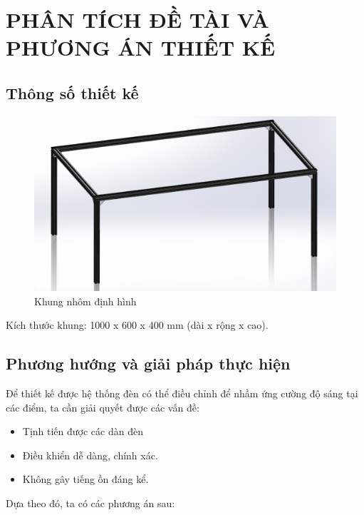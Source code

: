 \chapter{PHÂN TÍCH ĐỀ TÀI VÀ PHƯƠNG ÁN THIẾT KẾ}
\section{Thông số thiết kế}

\begin{center}
    \begin{figure}[ht]
    \begin{center}
     \includegraphics[scale=1]{Chapters/Chapter3/Images/Khungnhomdinhhinh}
    \end{center}
    \caption{Khung nhôm định hình}
    \label{fig:khungnhom}
    \end{figure}
\end{center}

Kích thước khung: 1000 x 600 x 400 mm (dài x rộng x cao).

\section{Phương hướng và giải pháp thực hiện}
Để thiết kế được hệ thống đèn có thể điều chỉnh để nhầm ứng cường độ sáng tại các điểm, ta cần giải quyết được các vấn đề:
\begin{itemize}
\item Tịnh tiến được các dàn đèn
\item Điều khiển dễ dàng, chính xác.
\item Không gây tiếng ồn đáng kể.
\end{itemize}

Dựa theo đó, ta có các phương án sau:

